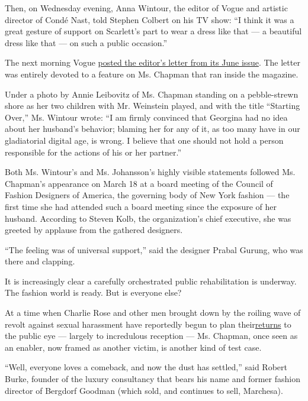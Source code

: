 Then, on Wednesday evening, Anna Wintour, the editor of Vogue and
artistic director of Condé Nast, told Stephen Colbert on his TV show:
``I think it was a great gesture of support on Scarlett's part to wear a
dress like that --- a beautiful dress like that --- on such a public
occasion.''

The next morning Vogue
\href{https://www.vogue.com/article/anna-wintour-editors-letter-vogue-june-2018}{posted
the editor's letter from its June issue}. The letter was entirely
devoted to a feature on Ms. Chapman that ran inside the magazine.

Under a photo by Annie Leibovitz of Ms. Chapman standing on a
pebble-strewn shore as her two children with Mr. Weinstein played, and
with the title ``Starting Over,'' Ms. Wintour wrote: ``I am firmly
convinced that Georgina had no idea about her husband's behavior;
blaming her for any of it, as too many have in our gladiatorial digital
age, is wrong. I believe that one should not hold a person responsible
for the actions of his or her partner.''

Both Ms. Wintour's and Ms. Johansson's highly visible statements
followed Ms. Chapman's appearance on March 18 at a board meeting of the
Council of Fashion Designers of America, the governing body of New York
fashion --- the first time she had attended such a board meeting since
the exposure of her husband. According to Steven Kolb, the
organization's chief executive, she was greeted by applause from the
gathered designers.

``The feeling was of universal support,'' said the designer Prabal
Gurung, who was there and clapping.

It is increasingly clear a carefully orchestrated public rehabilitation
is underway. The fashion world is ready. But is everyone else?

At a time when Charlie Rose and other men brought down by the roiling
wave of revolt against sexual harassment have reportedly begun to plan
their\href{https://www.nytimes3xbfgragh.onion/2018/04/27/opinion/sunday/metoo-comebacks-charlie-rose.html}{returns}
to the public eye --- largely to incredulous reception --- Ms. Chapman,
once seen as an enabler, now framed as another victim, is another kind
of test case.

``Well, everyone loves a comeback, and now the dust has settled,'' said
Robert Burke, founder of the luxury consultancy that bears his name and
former fashion director of Bergdorf Goodman (which sold, and continues
to sell, Marchesa).

